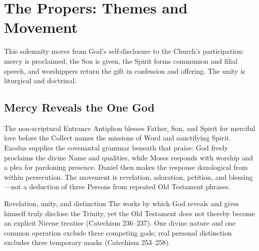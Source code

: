 \section*{The Propers: Themes and Movement}

This solemnity moves from God's self-disclosure to the Church's participation: mercy is proclaimed, the Son is given, the Spirit forms communion and filial speech, and worshippers return the gift in confession and offering. The unity is liturgical and doctrinal.

\begin{center}
\end{center}

\subsection*{Mercy Reveals the One God\enspace{}}

The non-scriptural Entrance Antiphon blesses Father, Son, and Spirit for merciful love before the Collect names the missions of Word and sanctifying Spirit. Exodus supplies the covenantal grammar beneath that praise: God freely proclaims the divine Name and qualities, while Moses responds with worship and a plea for pardoning presence. Daniel then makes the response doxological from within persecution. The movement is revelation, adoration, petition, and blessing---not a deduction of three Persons from repeated Old Testament phrases.

\begin{studybox}{Revelation, unity, and distinction}
The works by which God reveals and gives himself truly disclose the Trinity, yet the Old Testament does not thereby become an explicit Nicene treatise (Catechism 236--237). One divine nature and one common operation exclude three competing gods; real personal distinction excludes three temporary masks (Catechism 253--258).
\end{studybox}

